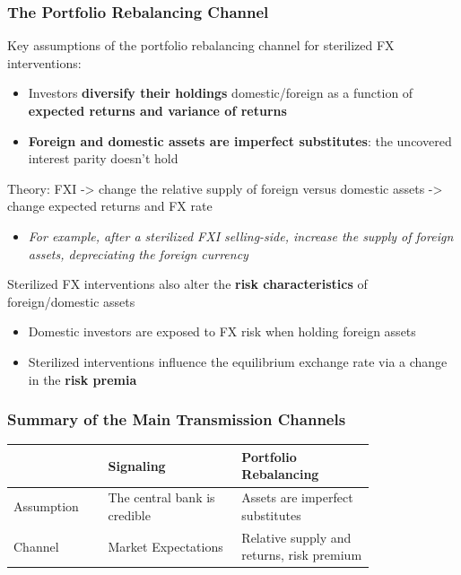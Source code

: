 \documentclass{beamer}
\newenvironment{wideitemize}{\itemize\addtolength{\itemsep}{10pt}}{\enditemize}
\begin{document}
\begin{frame}
  \frametitle{The Portfolio Rebalancing Channel}

  \begin{wideitemize}
  \item Key assumptions of the portfolio rebalancing channel for sterilized FX interventions:\\
    
  \begin{itemize}    
  \item Investors \textbf{diversify their holdings} domestic/foreign as a function of \textbf{expected returns and variance of returns}
  \item \textbf{Foreign and domestic assets are imperfect substitutes}: the uncovered interest parity doesn't hold   
  \end{itemize}

  \item Theory: FXI -> change the relative supply of foreign versus domestic assets -> change expected returns and FX rate
    \begin{itemize}
    \item \emph{For example, after a sterilized FXI selling-side, increase the supply of foreign assets, depreciating the foreign currency}
    \end{itemize}

  \item Sterilized FX interventions also alter the \textbf{risk characteristics} of foreign/domestic assets
    \begin{itemize}
    \item Domestic investors are exposed to FX risk when holding foreign assets
    \item Sterilized interventions influence the equilibrium exchange rate via a change in the \textbf{risk premia}
    \end{itemize}
    
  \end{wideitemize}
\end{frame}


\begin{frame}
  \frametitle{Summary of the Main Transmission Channels}

\begin{tabular}{p{0.2\linewidth}|p{0.3\linewidth}| p{0.3\linewidth}}
\hline
     &  Signaling  &  Portfolio Rebalancing \\ 
\hline
    Assumption &  The central bank is credible &  Assets are imperfect substitutes \\ 
\hline
    Channel & Market Expectations & Relative supply and returns, risk premium \\ 
\hline
\end{tabular}
\end{frame}
\end{document}
